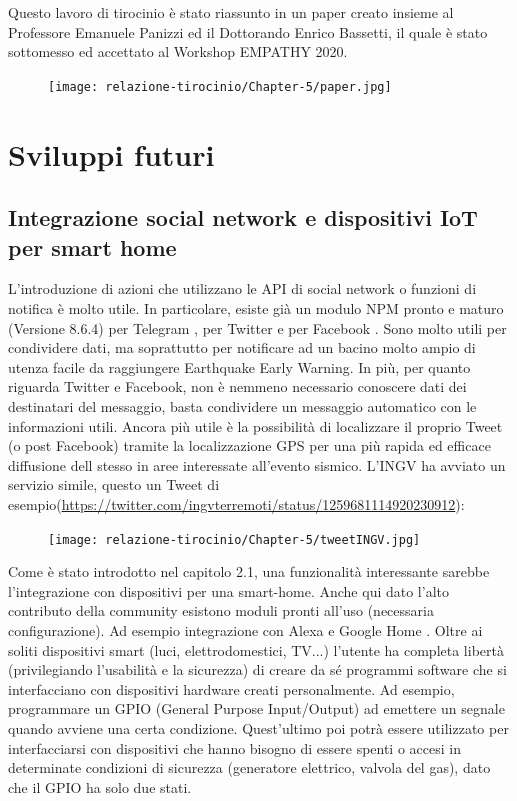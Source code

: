 \documentclass[a4paper,10pt]{memoir}
\begin{document}
\medskip

Questo lavoro di tirocinio è stato riassunto in un paper creato insieme al Professore Emanuele Panizzi ed il Dottorando Enrico Bassetti, il quale è stato sottomesso ed accettato al Workshop EMPATHY 2020.
\begin{figure}[hbt]
    \centering
    \texttt{[image: relazione-tirocinio/Chapter-5/paper.jpg]}
    \label{fig:paper}
\end{figure}

\section{Sviluppi futuri}

\subsection{Integrazione social network e dispositivi IoT per smart home}

L'introduzione di azioni che utilizzano le API di social network o funzioni di notifica è molto utile. In particolare, esiste già un modulo NPM pronto e maturo (Versione 8.6.4) per Telegram \cite{telegram-node}, per Twitter \cite{twitter-node} e per Facebook \cite{facebook-node}.
Sono molto utili per condividere dati, ma soprattutto per notificare ad un bacino molto ampio di utenza facile da raggiungere Earthquake Early Warning. In più, per quanto riguarda Twitter e Facebook, non è nemmeno necessario conoscere dati dei destinatari del messaggio, basta condividere un messaggio automatico con le informazioni utili. Ancora più utile è la possibilità di localizzare il proprio Tweet (o post Facebook) tramite la localizzazione GPS per una più rapida ed efficace diffusione dell stesso in aree interessate all'evento sismico.
L'INGV ha avviato un servizio simile, questo un Tweet di esempio(\href{https://twitter.com/ingvterremoti/status/1259681114920230912}{https://twitter.com/ingvterremoti/status/1259681114920230912}):
\begin{figure}[ht]
    \centering
    \texttt{[image: relazione-tirocinio/Chapter-5/tweetINGV.jpg]}
    \label{fig:tweetINGV}
\end{figure}

Come è stato introdotto nel capitolo 2.1, una funzionalità interessante sarebbe l'integrazione con dispositivi per una smart-home. Anche qui dato l'alto contributo della community esistono moduli pronti all'uso (necessaria configurazione). Ad esempio integrazione con Alexa \cite{alexa} e Google Home \cite{google-home}.
Oltre ai soliti dispositivi smart (luci, elettrodomestici, TV...) l'utente ha completa libertà (privilegiando l'usabilità e la sicurezza) di creare da sé programmi software che si interfacciano con dispositivi hardware creati personalmente. Ad esempio, programmare un GPIO (General Purpose Input/Output) ad emettere un segnale quando avviene una certa condizione. Quest'ultimo poi potrà essere utilizzato per interfacciarsi con dispositivi che hanno bisogno di essere spenti o accesi in determinate condizioni di sicurezza (generatore elettrico, valvola del gas), dato che il GPIO ha solo due stati.
\end{document}
